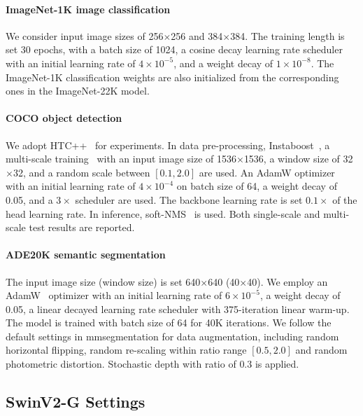 \documentclass[10pt,twocolumn,letterpaper]{article}
\begin{document}
\paragraph{ImageNet-1K image classification} We consider input image sizes of 256$\times$256 and 384$\times$384. The training length is set 30 epochs, with a batch size of 1024, a cosine decay learning rate scheduler with an initial learning rate of $4\times10^{-5}$, and a weight decay of $1\times10^{-8}$. The ImageNet-1K classification weights are also initialized from the corresponding ones in the ImageNet-22K model.


\paragraph{COCO object detection}
We adopt HTC++~\cite{chen2019htc,liu2021swin} for experiments. In data pre-processing, Instaboost~\cite{fang2019instaboost}, a multi-scale training~\cite{ghiasi2019fpn} with an input image size of 1536$\times$1536, a window size of 32$\times$32, and a random scale between $[0.1, 2.0]$ are used. An AdamW optimizer~\cite{loshchilov2017decoupled} with an initial learning rate of $4\times10^{-4}$ on batch size of 64, a weight decay of 0.05, and a $3\times$ scheduler are used. The backbone learning rate is set $0.1\times$ of the head learning rate. In inference, soft-NMS~\cite{Bodla2017softnms} is used. Both single-scale and multi-scale test results are reported.

\paragraph{ADE20K semantic segmentation}
The input image size (window size) is set 640$\times$640 (40$\times$40). We employ an AdamW~\cite{loshchilov2017decoupled} optimizer with an initial learning rate of $6\times10^{-5}$, a weight decay of 0.05, a linear decayed learning rate scheduler with 375-iteration linear warm-up. The model is trained with batch size of 64 for 40K iterations. We follow the default settings in mmsegmentation for data augmentation, including random horizontal flipping, random re-scaling within ratio range $[0.5, 2.0]$ and random photometric distortion. Stochastic depth with ratio of $0.3$ is applied. 

\subsection{SwinV2-G Settings}
\end{document}
